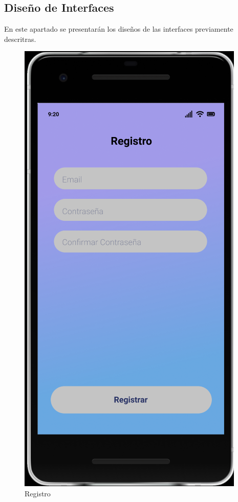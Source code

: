 \documentclass{article}
\begin{document}
\subsection{Diseño de Interfaces}%
En este apartado se presentarán los diseños de las interfaces previamente descritras.
\pagebreak
\begin{figure}[H]
    \centering
    \includegraphics[scale=0.9]{imgs/Figma/Registro2} 
    \caption{Registro}
\end{figure}
\end{document}
